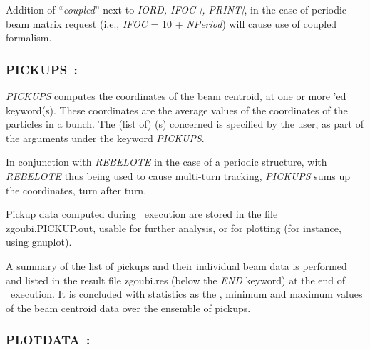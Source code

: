 \medskip

\noindent  Addition of ``\textsl{coupled}'' next to \textsl{IORD, IFOC [, PRINT]}, in the case of 
periodic beam matrix request (i.e., \textsl{IFOC} = 10  +  \textsl{NPeriod}) will cause use of coupled formalism. 




\newpage

 
\subsubsection*{PICKUPS~: \PICKUPSTitl}\label{PICKUPS} 
\medskip

\noindent \textsl{PICKUPS} computes the coordinates of the beam centroid, 
at one or more \LABEL'ed keyword(s). 
 These coordinates are the average values of the coordinates of the  particles in a bunch. 
The (list of) \LABEL(s) concerned is specified by the user, as part of the arguments under the keyword  \textsl{PICKUPS}.

\medskip

\noindent In conjunction with \textsl{REBELOTE} in the case of a periodic structure, 
with  \textsl{REBELOTE} thus being used to cause multi-turn tracking, 
  \textsl{PICKUPS} sums up the coordinates, turn after turn.        

\medskip

\noindent Pickup data computed during \zgou\ execution are stored in the file zgoubi.PICKUP.out, 
usable for further analysis, or for plotting (for instance, using gnuplot). 

\medskip

\noindent A summary of the list of pickups and their individual beam data is performed  and listed 
in the result file zgoubi.res  (below the   \textsl{END}   keyword) 
at the end of \zgou\ execution. It is concluded with statistics as the \rms, minimum and maximum values 
of the beam centroid data over the ensemble of pickups. 




\newpage


\subsubsection*{PLOTDATA~: \PLOTDATATitl~\protect\cite{BiblioPlot}} \label{PLOTDATA} 

\medskip

